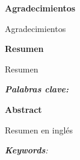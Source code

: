 \newpage

\begin{center}
   {\bf Agradecimientos} 
\end{center}

Agradecimientos

\newpage

\begin{center}
   {\bf Resumen} 
\end{center}

Resumen

\vspace{0.6 cm}
{\sl \textbf{Palabras clave:} }
\vspace{1 cm}
\begin{center}
   {\bf Abstract} 
\end{center}

Resumen en inglés

\vspace{0.6 cm}

{\sl \textbf{Keywords}: } 